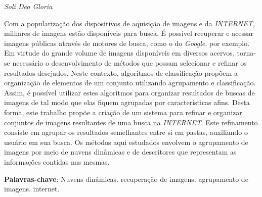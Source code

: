 \documentclass[
	12pt,				%
	openright,			%
	oneside,			%
	a4paper,			%
	english,			%
	brazil				%
	]{abntex2}
\begin{document}



\begin{epigrafe}
    \vspace*{\fill}
	\begin{flushright}
		\textit{Soli Deo Gloria \\
		}
	\end{flushright}
\end{epigrafe}


\setlength{\absparsep}{18pt} %
\begin{resumo}
Com a popularização dos dispositivos de aquisição de imagens e da \emph{INTERNET}, milhares de imagens estão disponíveis para busca. É possível recuperar e acessar imagens públicas através de motores de busca, como o do \emph{Google}, por exemplo.  Em virtude do grande volume de imagens disponíveis em diversos acervos, torna-se necessário o desenvolvimento de métodos que possam selecionar e refinar os resultados desejados. Neste contexto, algoritmos de classificação propõem a organização de elementos de um conjunto utilizando agrupamento e classificação. Assim, é possível utilizar estes algoritmos para organizar resultados de buscas de imagens de tal modo que elas fiquem agrupadas por características afins. Desta forma, este trabalho propõe a criação de um sistema para refinar e organizar conjuntos de imagens resultantes de uma busca na \emph{INTERNET}. Este refinamento consiste em agrupar os resultados semelhantes entre si em pastas, auxiliando o usuário em sua busca. Os métodos aqui estudados envolvem o agrupamento de imagens por meio de nuvens dinâmicas e de descritores que representam as informações contidas nas mesmas.

 \textbf{Palavras-chave}: Nuvens dinâmicas. recuperação de imagens. agrupamento de imagens. internet.
\end{resumo}
\end{document}
